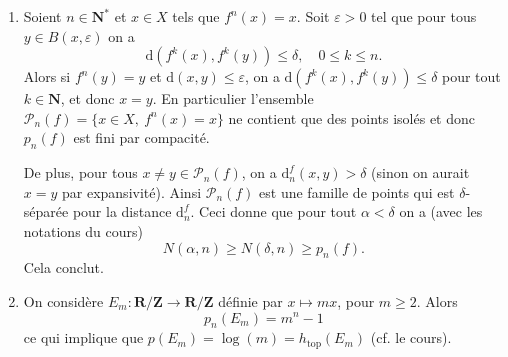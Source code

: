 \documentclass[a4paper,12pt,openany]{article}
\theoremstyle{plain}
\theoremstyle{definition}
\newcommand{\dd}{\mathrm{d}}
\newcommand{\R}{\mathbf{R}}
\newcommand{\Z}{\mathbf{Z}}
\newcommand{\N}{\mathbf{N}}
\newcommand{\htop}{h_\mathrm{top}}
\begin{document}
\begin{enumerate}
\item Soient $n \in \N^*$ et $x \in X$ tels que $f^n(x) = x$. Soit $\varepsilon > 0$ tel que pour tous $y \in B(x, \varepsilon)$ on a
$$
\dd(f^k(x), f^k(y)) \leq \delta, \quad 0 \leq k \leq n.
$$
Alors si $f^n(y) = y$ et $\dd(x,y) \leq \varepsilon$, on a $\dd(f^k(x), f^k(y)) \leq \delta$ pour tout $k \in \N$, et donc $x = y$. En particulier l'ensemble $\mathcal{P}_n(f) = \{x  \in X,~ f^n(x) = x\}$ ne contient que des points isol\'es et donc $p_n(f)$ est fini par compacit\'e. 

De plus, pour tous $x\neq y \in \mathcal{P}_n(f)$, on a $\dd^f_n(x,y) > \delta$ (sinon on aurait $x=y$ par expansivit\'e). Ainsi $\mathcal{P}_n(f)$ est une famille de points qui est $\delta$-s\'epar\'ee pour la distance $\dd^f_n$. Ceci donne que pour tout $\alpha < \delta$ on a (avec les notations du cours)
$$
N(\alpha, n) \geq N(\delta, n) \geq p_n(f).
$$
Cela conclut.
\item On consid\`ere $E_m : \R/\Z \to \R/\Z$ d\'efinie par $x \mapsto mx$, pour $m \geq 2$. Alors
$$
p_n(E_m) = m^n-1
$$
ce qui implique que $p(E_m) = \log(m) = \htop(E_m)$ (cf. le cours).


\end{enumerate}
\end{document}
